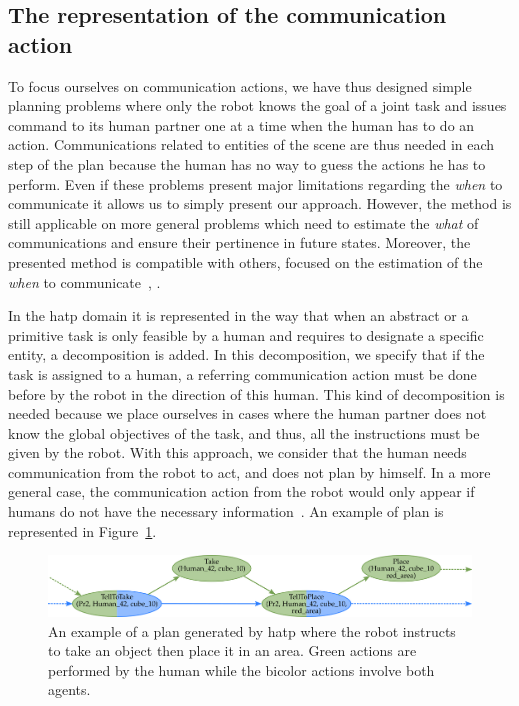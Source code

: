 \subsection{The representation of the communication action}

To focus ourselves on communication actions, we have thus designed simple planning problems where only the robot knows the goal of a joint task and issues command to its human partner one at a time when the human has to do an action. Communications related to entities of the scene are thus needed in each step of the plan because the human has no way to guess the actions he has to perform. Even if these problems present major limitations regarding the \textit{when} to communicate it allows us to simply present our approach. However, the method is still applicable on more general problems which need to estimate the \textit{what} of communications and ensure their pertinence in future states. Moreover, the presented method is compatible with others, focused on the estimation of the \textit{when} to communicate~\cite{devin_2016_implemented}, \cite{unhelkar_2020_decision}.

In the \acrshort{hatp} domain it is represented in the way that when an abstract or a primitive task is only feasible by a human and requires to designate a specific entity, a decomposition is added. In this decomposition, we specify that if the task is assigned to a human, a referring communication action must be done before by the robot in the direction of this human. This kind of decomposition is needed because we place ourselves in cases where the human partner does not know the global objectives of the task, and thus, all the instructions must be given by the robot. With this approach, we consider that the human needs communication from the robot to act, and does not plan by himself. In a more general case, the communication action from the robot would only appear if humans do not have the necessary information~\cite{devin_2016_implemented}. An example of plan is represented in Figure~\ref{fig:chap5_plan}.

\begin{figure}[!ht]
\centering
\includegraphics[width=\textwidth]{figures/chapter5/plan.png}
\caption{\label{fig:chap5_plan} An example of a plan generated by \acrshort{hatp} where the robot instructs to take an object then place it in an area. Green actions are performed by the human while the bicolor actions involve both agents. }
\end{figure}

